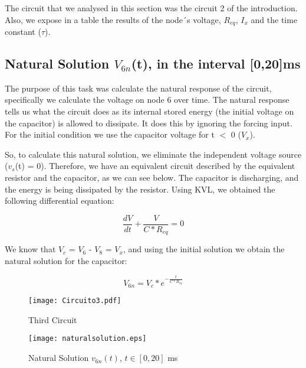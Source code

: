 \par The circuit that we analysed in this section was the circuit 2 of the introduction. Also, we expose in a table the results of the node´s voltage, $R_{eq}$, $I_x$ and the time constant ($\tau$).

 
\subsection{Natural Solution $V_{6n}$(t), in the interval [0,20]ms}

The purpose of this task was calculate the natural response of the circuit, specifically we calculate the voltage on node 6 over time. The natural response tells us what the circuit does as its internal stored energy (the initial voltage on the capacitor) is allowed to dissipate. It does this by ignoring the forcing input. For the initial condition we use the capacitor voltage for t $<$ 0 ($V_x$). 

\par So, to calculate this natural solution, we eliminate the independent voltage source ($v_s$(t) = 0). Therefore, we have an equivalent circuit described by the equivalent resistor and the capacitor, as we can see below. The capacitor is discharging, and the energy is being dissipated by the resistor. Using KVL, we obtained the following differential equation:


\begin{equation}
    \frac{dV}{dt} + \frac{V}{C*R_{eq}} = 0
\end{equation}

\par We know that $V_c$ = $V_6$ - $V_8$ = $V_x$, and using the initial solution we obtain the natural solution for the capacitor:

\begin{equation}
    V_{6n} = V_{c}*e^{-\frac{t}{C*R_{eq}}}
\end{equation}

\begin{figure}[!h] \centering
\texttt{[image: Circuito3.pdf]}
\caption{Third Circuit}
\label{fig:snat}
\end{figure}

\begin{figure}[!h] \centering
\texttt{[image: naturalsolution.eps]}
\caption{Natural Solution $v_{6n}(t)$, $t\in[0,20]$ ms}
\label{fig:snat}
\end{figure}


\newpage
